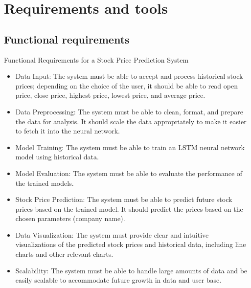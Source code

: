 \chapter{Requirements and tools}

\section{Functional requirements}
Functional Requirements for a Stock Price Prediction System
\begin{itemize}
    \item Data Input: The system must be able to accept and process historical stock prices; depending on the choice of the user, it should be able to read open price, close price, highest price, lowest price, and average price.
    \item Data Preprocessing: The system must be able to clean, format, and prepare the data for analysis. It should scale the data appropriately to make it easier to fetch it into the neural network.
    \item Model Training: The system must be able to train an LSTM neural network model using historical data.
    \item Model Evaluation: The system must be able to evaluate the performance of the trained models.
    \item Stock Price Prediction: The system must be able to predict future stock prices based on the trained model. It should predict the prices based on the chosen parameters (company name).
    \item Data Visualization: The system must provide clear and intuitive visualizations of the predicted stock prices and historical data, including line charts and other relevant charts.
    \item Scalability: The system must be able to handle large amounts of data and be easily scalable to accommodate future growth in data and user base.
\end{itemize} 

